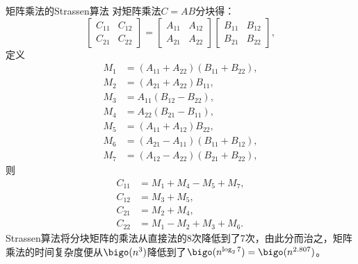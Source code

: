 \begin{theorem}
    {矩阵乘法的Strassen算法}{}
    对矩阵乘法$C=AB$分块得：
    \[
        \begin{bmatrix}
            C_{11}&C_{12}\\
            C_{21}&C_{22}
        \end{bmatrix}=\begin{bmatrix}
            A_{11}&A_{12}\\
            A_{21}&A_{22}
        \end{bmatrix}\begin{bmatrix}
            B_{11}&B_{12}\\
            B_{21}&B_{22}
        \end{bmatrix},
    \]
    定义 
    \begin{subequations}
        \begin{align}
            M_1&=(A_{11}+A_{22})(B_{11}+B_{22}),\\
            M_2&=(A_{21}+A_{22})B_{11},\\
            M_3&=A_{11}(B_{12}-B_{22}),\\
            M_4&=A_{22}(B_{21}-B_{11}),\\
            M_5&=(A_{11}+A_{12})B_{22},\\
            M_6&=(A_{21}-A_{11})(B_{11}+B_{12}),\\
            M_7&=(A_{12}-A_{22})(B_{21}+B_{22}),
        \end{align}
    \end{subequations}
    则
    \begin{subequations}
        \begin{align}
            C_{11}&=M_1+M_4-M_5+M_7,\\
            C_{12}&=M_3+M_5,\\
            C_{21}&=M_2+M_4,\\
            C_{22}&=M_1-M_2+M_3+M_6.
        \end{align}
    \end{subequations}
    Strassen算法将分块矩阵的乘法从直接法的8次降低到了7次，由此分而治之，矩阵乘法的时间复杂度便从$\bigo(n^3)$降低到了$\bigo(n^{\log_27})=\bigo(n^{2.807})$。
\end{theorem}


